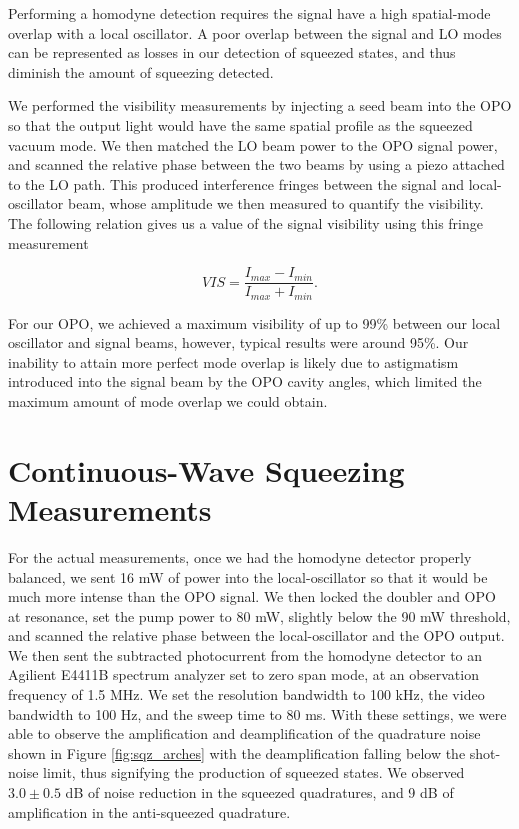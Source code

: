 Performing a homodyne detection requires the signal have a high spatial-mode overlap with a local oscillator.  A poor overlap between the signal and LO modes can be represented as losses in our detection of squeezed states, and thus diminish the amount of squeezing detected.

We performed the visibility measurements by injecting a seed beam into the OPO so that the output light would have the same spatial profile as the squeezed vacuum mode.  We then matched the LO beam power to the OPO signal power, and scanned the relative phase between the two beams by using a piezo attached to the LO path.  This produced interference fringes between the signal and local-oscillator beam, whose amplitude we then measured to quantify the visibility.  The following relation gives us a value of the signal visibility using this fringe measurement \cite{bachor2004guide}

\begin{equation}
  \label{eq:visibility}
  VIS = \frac{I_{max}-I_{min}}{I_{max} + I_{min}} .
\end{equation}

\noindent
For our OPO, we achieved a maximum visibility of up to 99\% between our local oscillator and signal beams, however, typical results were around 95\%.  Our inability to attain more perfect mode overlap is likely due to astigmatism introduced into the signal beam by the OPO cavity angles, which limited the maximum amount of mode overlap we could obtain.


\section{Continuous-Wave Squeezing Measurements}
\label{continuous_wave_squeezing_measurements} 

For the actual measurements, once we had the homodyne detector properly
balanced, we sent 16 mW of power into the local-oscillator so that it would be
much more intense than the OPO signal. We then locked the doubler and OPO at
resonance, set the pump power to 80 mW, slightly below the 90 mW threshold,
and scanned the relative phase between the local-oscillator and the OPO
output.  We then sent the subtracted photocurrent from the homodyne detector
to an Agilient E4411B spectrum analyzer set to zero span mode, at an
observation frequency of 1.5 MHz.  We set the resolution bandwidth to 100 kHz,
the video bandwidth to 100 Hz, and the sweep time to 80 ms.  With these
settings, we were able to observe the amplification and deamplification of the
quadrature noise shown in Figure \ref{fig:sqz_arches} with the deamplification
falling below the shot-noise limit, thus signifying the production of squeezed
states.  We observed $3.0 \pm 0.5$ dB of noise reduction in the squeezed quadratures, and 9 dB of amplification in the anti-squeezed quadrature.  

